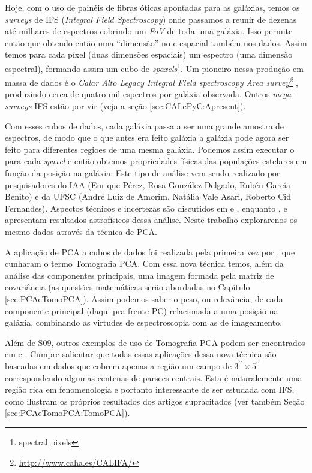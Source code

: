 Hoje, com o uso de painéis de fibras óticas apontadas para as galáxias, temos os {\em surveys} de IFS ({\em Integral
Field Spectroscopy}) onde passamos a reunir de dezenas até milhares de espectros cobrindo um {\em FoV} de toda uma
galáxia. Isso permite então que obtendo então uma ``dimensão'' no c espacial também nos dados. Assim temos para cada
píxel (duas dimensões espaciais) um espectro (uma dimensão espectral), formando assim um cubo de {\em
spaxels}\footnote{spectral pixels}. Um pioneiro nessa produção em massa de dados é o {\em Calar Alto Legacy Integral
Field spectroscopy Area survey\footnote{\url{http://www.caha.es/CALIFA/}}} \citep[CALIFA; ][]{CALIFAPresent2012},
produzindo cerca de quatro mil espectros por galáxia observada. Outros {\em mega-surveys} IFS estão por vir (veja a
seção \ref{sec:CALePyC:Apresent}).

Com esses cubos de dados, cada galáxia passa a ser uma grande amostra de espectros, de modo que o que antes era feito
galáxia a galáxia pode agora ser feito para diferentes regioes de uma mesma galáxia. Podemos assim executar o \starlight
para cada {\em spaxel} e então obtemos propriedades físicas das populações estelares em função da posição na galáxia.
Este tipo de análise vem sendo realizado por pesquisadores do IAA (Enrique Pérez, Rosa González Delgado, Rubén
García-Benito) e da UFSC (André Luiz de Amorim, Natália Vale Asari, Roberto Cid Fernandes). Aspectos técnicos e
incertezas são discutidos em \citet[][CF13 daqui pra frente]{CidFernandes2013} e \citet{CidFernandes2014}, enquanto
\citet{Perez2013}, e \citet{GonzalezDelgado2013} apresentam resultados astrofísicos dessa análise. Neste trabalho
explorarenos os mesmo dados através da técnica de PCA.

A aplicação de PCA a cubos de dados foi realizada pela primeira vez por \citet[][S09 daqui pra frente]{Steiner2009},
que cunharam o termo Tomografia PCA. Com essa nova técnica temos, além da análise das componentes principais, uma imagem formada pela matriz
de covariância (as questões matemáticas serão abordadas no Capítulo \ref{sec:PCAeTomoPCA}). Assim podemos saber o peso,
ou relevância, de cada componente principal (daqui pra frente PC) relacionada a uma posição na galáxia, combinando as
virtudes de espectroscopia com as de imageamento.

Além de S09, outros exemplos de uso de Tomografia PCA podem ser encontrados em \citet{Riffel2011} e \citet{Ricci2011}.
Cumpre salientar que todas essas aplicações dessa nova técnica são baseadas em dados que cobrem apenas a região um campo
de \ojo $3^{\prime\prime} \times 5^{\prime\prime}$ correspondendo algumas centenas de parsecs centrais. Esta é
naturalemente uma região rica em fenomenologia e portanto interessante de ser estudada com IFS, como ilustram os
próprios resultados dos artigos supracitados (ver também Seção \ref{sec:PCAeTomoPCA:TomoPCA}).

